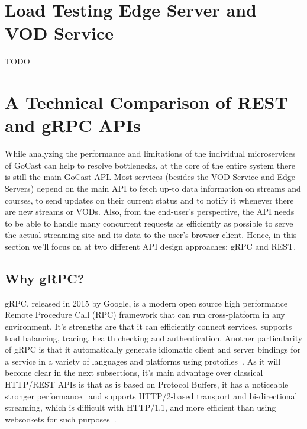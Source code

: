 

\section{Load Testing Edge Server and VOD Service}

TODO

\section{A Technical Comparison of REST and gRPC APIs}

While analyzing the performance and limitations of the individual microservices of GoCast can help to resolve bottlenecks, at the core of the entire system there is still the main GoCast \ac{API}.
Most services (besides the VOD Service and Edge Servers) depend on the main \ac{API} to fetch up-to data information on streams and courses, to send updates on their current status and to notify it whenever there are new streams or \ac{VOD}s. Also, from the end-user's perspective, the API needs to be able to handle many concurrent requests as efficiently as possible to serve the actual streaming site and its data to the user's browser client.
Hence, in this section we'll focus on at two different \ac{API} design approaches: gRPC and REST.

\subsection{Why gRPC?}

gRPC, released in 2015 by Google, is a modern open source high performance Remote Procedure Call (RPC) framework that can run cross-platform in any environment. It's strengths are that it can efficiently connect services, supports load balancing, tracing, health checking and authentication.
Another particularity of gRPC is that it automatically generate idiomatic client and server bindings for a service in a variety of languages and platforms using protofiles~\parencite{grpc_vs_rest}.
As it will become clear in the next subsections, it's main advantage over classical HTTP/REST \ac{API}s is that as is based on Protocol Buffers, it has a noticeable stronger performance~\parencite{grpc_vs_rest_2} and supports HTTP/2-based transport and bi-directional streaming, which is difficult with HTTP/1.1, and more efficient than using websockets for such purposes~\parencite{grpc_dev}.


